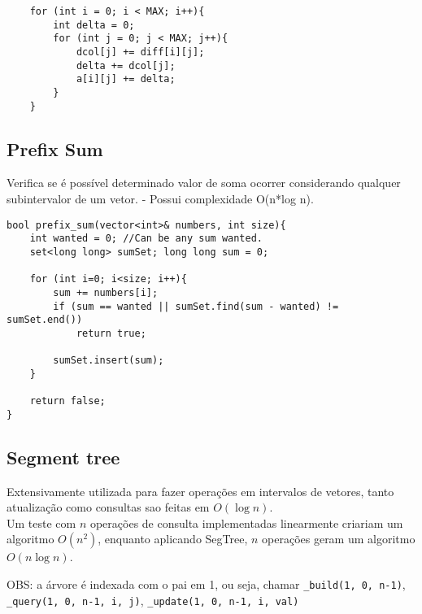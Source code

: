 \begin{verbatim}
    for (int i = 0; i < MAX; i++){
        int delta = 0;
        for (int j = 0; j < MAX; j++){
            dcol[j] += diff[i][j];
            delta += dcol[j];
            a[i][j] += delta;
        }
    }
\end{verbatim}

\subsection{Prefix Sum}
    Verifica se é possível determinado valor de soma ocorrer considerando qualquer subintervalor de um vetor.
    - Possui complexidade O(n*log n).

\begin{verbatim}
bool prefix_sum(vector<int>& numbers, int size){
    int wanted = 0; //Can be any sum wanted.
    set<long long> sumSet; long long sum = 0; 

    for (int i=0; i<size; i++){
        sum += numbers[i];
        if (sum == wanted || sumSet.find(sum - wanted) != sumSet.end())
            return true;

        sumSet.insert(sum);
    }
    
    return false;
}
\end{verbatim}






\subsection{Segment tree}
\par Extensivamente utilizada para fazer operações em intervalos de vetores, tanto atualização como consultas sao feitas em $O(\log n)$. \\
Um teste com $n$ operações de consulta implementadas linearmente criariam um algoritmo $O(n^2)$, enquanto aplicando SegTree, $n$ operações geram um algoritmo $O(n\log n)$.
\par OBS: a árvore é indexada com o pai em 1, ou seja, chamar \lstinline{_build(1, 0, n-1)}, \lstinline{_query(1, 0, n-1, i, j)}, \lstinline{_update(1, 0, n-1, i, val)}

